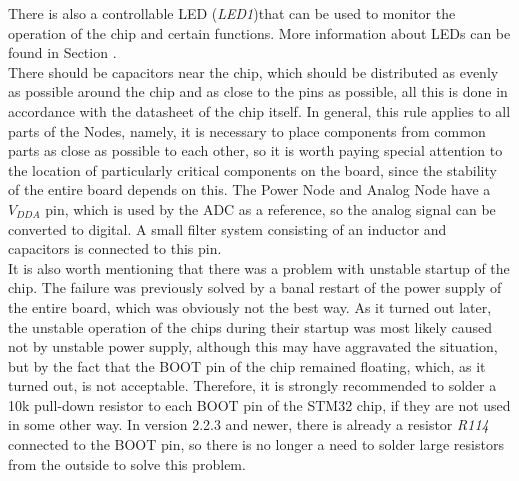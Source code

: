 \documentclass[10pt]{datasheet}
\begin{document}
There is also a controllable LED (\textit{LED1})that can be used to monitor the operation of the chip and certain functions. More information about LEDs can be found in Section .\\
There should be capacitors near the chip, which should be distributed as evenly as possible around the chip and as close to the pins as possible, all this is done in accordance with the datasheet of the chip itself. In general, this rule applies to all parts of the Nodes, namely, it is necessary to place components from common parts as close as possible to each other, so it is worth paying special attention to the location of particularly critical components on the board, since the stability of the entire board depends on this. The Power Node and Analog Node have a $V_{DDA}$ pin, which is used by the ADC as a reference, so the analog signal can be converted to digital. A small filter system consisting of an inductor and capacitors is connected to this pin.\\
It is also worth mentioning that there was a problem with unstable startup of the chip. The failure was previously solved by a banal restart of the power supply of the entire board, which was obviously not the best way. As it turned out later, the unstable operation of the chips during their startup was most likely caused not by unstable power supply, although this may have aggravated the situation, but by the fact that the BOOT pin of the chip remained floating, which, as it turned out, is not acceptable. Therefore, it is strongly recommended to solder a 10k pull-down resistor to each BOOT pin of the STM32 chip, if they are not used in some other way. In version 2.2.3 and newer, there is already a resistor \textit{R114} connected to the BOOT pin, so there is no longer a need to solder large resistors from the outside to solve this problem. \\
\end{document}

